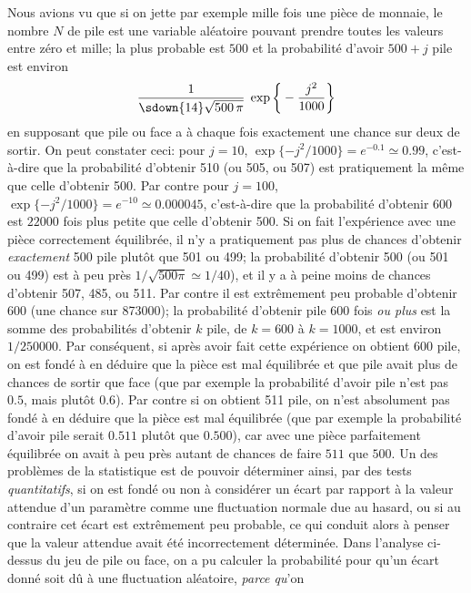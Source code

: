 Nous avions vu que si on jette par exemple mille fois une pi\`ece de
monnaie, le nombre $N$ de pile est une variable al\'eatoire pouvant
prendre toutes les valeurs entre z\'ero et mille; la plus probable est
$500$ et la probabilit\'e d'avoir $500 + j$ pile est environ
$${1\over \sdown{14}\sqrt{500\,\pi}}\;\exp\bigg\{-{j^2 \over 1000}\bigg\}$$
en supposant que pile ou face a \`a chaque fois exactement une chance sur
deux de sortir. On peut constater ceci: pour $j=10$,  $\exp\{-{j^2 / 
1000}\} = e^{-0.1} \simeq 0.99$, c'est-\`a-dire que la probabilit\'e
d'obtenir 510 (ou 505, ou 507) est pratiquement la m\^eme que celle
d'obtenir 500. Par contre pour $j=100$, $\exp\{-{j^2 / 1000}\} = e^{-10}
\simeq 0.000045$,  c'est-\`a-dire que la probabilit\'e d'obtenir 600 est
$22000$ fois plus petite que celle d'obtenir 500. Si on fait l'exp\'erience
avec une pi\`ece correctement \'equilibr\'ee, il n'y a pratiquement pas
plus de chances d'obtenir {\it exactement} 500 pile plut\^ot que 501 ou
499; la probabilit\'e d'obtenir 500 (ou 501 ou 499) est \`a peu pr\`es
${1/\sqrt{500 \pi}} \simeq 1/40$), et il y a \`a peine moins de 
chances d'obtenir 507, 485, ou 511. Par contre il est extr\^emement
peu probable d'obtenir 600 (une chance sur 873000); la probabilit\'e 
d'obtenir pile 600 fois {\it ou plus} est la somme des probabilit\'es 
d'obtenir $k$ pile, de $k=600$ \`a $k=1000$, et est environ $1 / 250000$. 
\medskip 
Par cons\'equent, si apr\`es avoir fait cette exp\'erience on obtient 600
pile, on est fond\'e \`a en d\'eduire que la pi\`ece est mal \'equilibr\'ee
et que pile avait plus de chances de sortir que face (que par exemple la 
probabilit\'e d'avoir pile n'est pas $0.5$, mais plut\^ot $0.6$). Par contre
si on obtient 511 pile, on n'est absolument pas fond\'e \`a en d\'eduire
que la pi\`ece est mal \'equilibr\'ee (que par exemple la probabilit\'e 
d'avoir pile serait $0.511$ plut\^ot que $0.500$), car avec une pi\`ece
parfaitement \'equilibr\'ee on avait \`a peu pr\`es autant de chances de
faire $511$ que $500$. 
\medskip 
Un des probl\`emes de la statistique est de pouvoir d\'eterminer ainsi, 
par des tests {\it quantitatifs}, si on est fond\'e ou non \`a consid\'erer
un \'ecart par rapport \`a la valeur attendue d'un param\`etre comme une 
fluctuation normale due au hasard, ou si au contraire cet \'ecart est 
extr\^emement peu probable, ce qui conduit alors \`a penser que la valeur 
attendue avait \'et\'e incorrectement d\'etermin\'ee. Dans l'analyse 
ci-dessus du jeu de pile ou face, on a pu calculer la probabilit\'e pour qu'un 
\'ecart donn\'e soit d\^u \`a une fluctuation al\'eatoire, {\it parce qu}'on 
